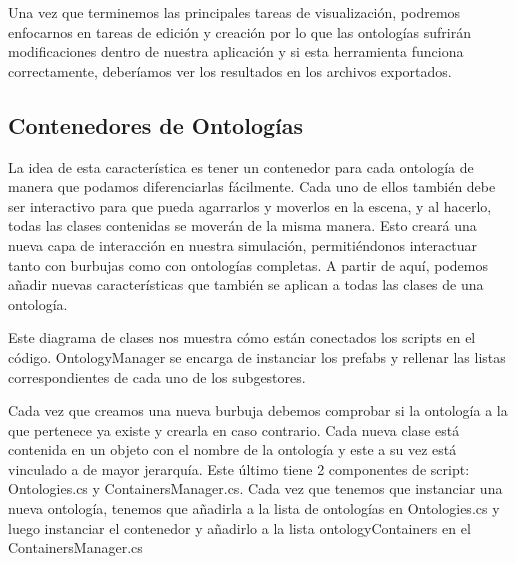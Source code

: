 Una vez que terminemos las principales tareas de visualización, podremos enfocarnos en tareas de edición y creación por lo que las ontologías sufrirán modificaciones dentro de nuestra aplicación y si esta herramienta funciona correctamente, deberíamos ver los resultados en los archivos exportados.

\subsection{Contenedores de Ontologías}

La idea de esta característica es tener un contenedor para cada ontología de manera que podamos diferenciarlas fácilmente. Cada uno de ellos también debe ser interactivo para que pueda agarrarlos y moverlos en la escena, y al hacerlo, todas las clases contenidas se moverán de la misma manera. Esto creará una nueva capa de interacción en nuestra simulación, permitiéndonos interactuar tanto con burbujas como con ontologías completas. A partir de aquí, podemos añadir nuevas características que también se aplican a todas las clases de una ontología.

Este diagrama de clases nos muestra cómo están conectados los scripts en el código. OntologyManager se encarga de instanciar los prefabs y rellenar las listas correspondientes de cada uno de los subgestores.

Cada vez que creamos una nueva burbuja debemos comprobar si la ontología a la que pertenece ya existe y crearla en caso contrario. Cada nueva clase está contenida en un objeto con el nombre de la ontología y este a su vez está vinculado a de mayor jerarquía. Este último tiene 2 componentes de script: Ontologies.cs y ContainersManager.cs. Cada vez que tenemos que instanciar una nueva ontología, tenemos que añadirla a la lista de ontologías en Ontologies.cs y luego instanciar el contenedor y añadirlo a la lista ontologyContainers en el ContainersManager.cs

